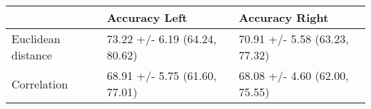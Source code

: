 \begin{tabular}{lll}
\toprule
{} &                  Accuracy Left &                 Accuracy Right \\
\midrule
Euclidean distance &  73.22 +/- 6.19 (64.24, 80.62) &  70.91 +/- 5.58 (63.23, 77.32) \\
Correlation        &  68.91 +/- 5.75 (61.60, 77.01) &  68.08 +/- 4.60 (62.00, 75.55) \\
\bottomrule
\end{tabular}
